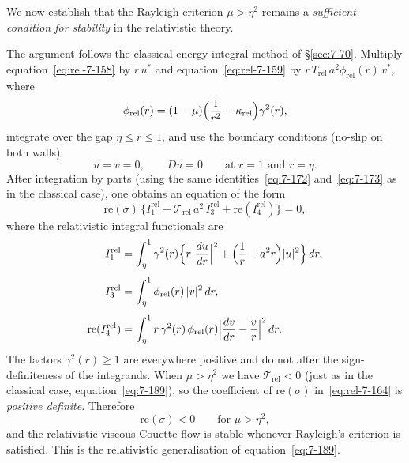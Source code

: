 We now establish that the Rayleigh criterion $\mu>\eta^{2}$ remains a
\emph{sufficient condition for stability} in the relativistic theory.

The argument follows the classical energy-integral method of
\S\ref{sec:7-70}.  Multiply equation~\eqref{eq:rel-7-158} by
$r\,u^{*}$ and equation~\eqref{eq:rel-7-159} by
$r\,T_{\mathrm{rel}}\,a^{2}\phi_{\mathrm{rel}}(r)\,v^{*}$, where
\begin{equation}
\label{eq:rel-7-162}
\phi_{\mathrm{rel}}(r)
  = (1-\mu)\Bigl(\frac{1}{r^{2}}-\kappa_{\mathrm{rel}}\Bigr)
    \gamma^{2}(r),
\end{equation}
integrate over the gap $\eta\le r\le 1$, and use the boundary
conditions (no-slip on both walls):
\begin{equation}
\label{eq:rel-7-163}
u=v=0, \qquad Du=0
\qquad\text{at } r=1 \text{ and } r=\eta.
\end{equation}
After integration by parts (using the same identities~\eqref{eq:7-172}
and~\eqref{eq:7-173} as in the classical case), one obtains an
equation of the form
\begin{equation}
\label{eq:rel-7-164}
\mathrm{re}(\sigma)\,
  \bigl\{I_{1}^{\mathrm{rel}}
    - \mathscr{T}_{\mathrm{rel}}\,a^{2}\,I_{3}^{\mathrm{rel}}
    + \mathrm{re}(I_{4}^{\mathrm{rel}})\bigr\} = 0,
\end{equation}
where the relativistic integral functionals are
\begin{align}
\label{eq:rel-7-165}
I_{1}^{\mathrm{rel}}
  &= \int_{\eta}^{1}\gamma^{2}(r)
     \Bigl\{r\Bigl|\frac{du}{dr}\Bigr|^{2}
     + \Bigl(\frac{1}{r}+a^{2}r\Bigr)|u|^{2}\Bigr\}\,dr,
\\[4pt]
I_{3}^{\mathrm{rel}}
  &= \int_{\eta}^{1}\phi_{\mathrm{rel}}(r)\,|v|^{2}\,dr,
\\[4pt]
\mathrm{re}(I_{4}^{\mathrm{rel}})
  &= \int_{\eta}^{1}r\,\gamma^{2}(r)\,\phi_{\mathrm{rel}}(r)
     \Bigl|\frac{dv}{dr}-\frac{v}{r}\Bigr|^{2}\,dr.
\end{align}
The factors $\gamma^{2}(r)\ge 1$ are everywhere positive and do not
alter the sign-definiteness of the integrands.  When $\mu>\eta^{2}$
we have $\mathscr{T}_{\mathrm{rel}}<0$ (just as in the classical
case, equation~\eqref{eq:7-189}), so the coefficient of
$\mathrm{re}(\sigma)$ in~\eqref{eq:rel-7-164} is
\emph{positive definite}.  Therefore
\begin{equation}
\label{eq:rel-7-166}
\boxed{\mathrm{re}(\sigma) < 0
  \qquad\text{for } \mu > \eta^{2},}
\end{equation}
and the relativistic viscous Couette flow is stable whenever
Rayleigh's criterion is satisfied.  This is the relativistic
generalisation of equation~\eqref{eq:7-189}.

